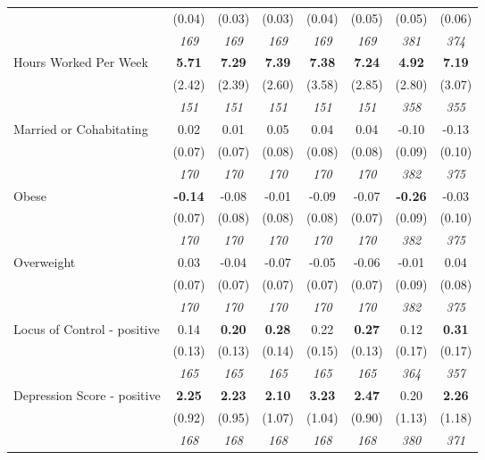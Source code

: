 \begin{tabular}{l c c c c c c c}
& (0.04) & (0.03) & (0.03) & (0.04) & (0.05) & (0.05) & (0.06) \\
& \textit{ 169 } & \textit{ 169 } & \textit{ 169 } & \textit{ 169 } & \textit{ 169 } & \textit{ 381 } & \textit{ 374 } \\
Hours Worked Per Week & \textbf{ 5.71 } & \textbf{ 7.29 } & \textbf{ 7.39 } & \textbf{7.38} & \textbf{7.24} & \textbf{ 4.92 } & \textbf{ 7.19 } \\
& (2.42) & (2.39) & (2.60) & (3.58) & (2.85) & (2.80) & (3.07) \\
& \textit{ 151 } & \textit{ 151 } & \textit{ 151 } & \textit{ 151 } & \textit{ 151 } & \textit{ 358 } & \textit{ 355 } \\
Married or Cohabitating & 0.02 & 0.01 & 0.05 & 0.04 & 0.04 & -0.10 & -0.13 \\
& (0.07) & (0.07) & (0.08) & (0.08) & (0.08) & (0.09) & (0.10) \\
& \textit{ 170 } & \textit{ 170 } & \textit{ 170 } & \textit{ 170 } & \textit{ 170 } & \textit{ 382 } & \textit{ 375 } \\
Obese & \textbf{ -0.14 } & -0.08 & -0.01 & -0.09 & -0.07 & \textbf{ -0.26 } & -0.03 \\
& (0.07) & (0.08) & (0.08) & (0.08) & (0.07) & (0.09) & (0.10) \\
& \textit{ 170 } & \textit{ 170 } & \textit{ 170 } & \textit{ 170 } & \textit{ 170 } & \textit{ 382 } & \textit{ 375 } \\
Overweight & 0.03 & -0.04 & -0.07 & -0.05 & -0.06 & -0.01 & 0.04 \\
& (0.07) & (0.07) & (0.07) & (0.07) & (0.07) & (0.09) & (0.08) \\
& \textit{ 170 } & \textit{ 170 } & \textit{ 170 } & \textit{ 170 } & \textit{ 170 } & \textit{ 382 } & \textit{ 375 } \\
Locus of Control - positive & 0.14 & \textbf{ 0.20 } & \textbf{ 0.28 } & 0.22 & \textbf{0.27} & 0.12 & \textbf{ 0.31 } \\
& (0.13) & (0.13) & (0.14) & (0.15) & (0.13) & (0.17) & (0.17) \\
& \textit{ 165 } & \textit{ 165 } & \textit{ 165 } & \textit{ 165 } & \textit{ 165 } & \textit{ 364 } & \textit{ 357 } \\
Depression Score - positive & \textbf{ 2.25 } & \textbf{ 2.23 } & \textbf{ 2.10 } & \textbf{3.23} & \textbf{2.47} & 0.20 & \textbf{ 2.26 } \\
& (0.92) & (0.95) & (1.07) & (1.04) & (0.90) & (1.13) & (1.18) \\
& \textit{ 168 } & \textit{ 168 } & \textit{ 168 } & \textit{ 168 } & \textit{ 168 } & \textit{ 380 } & \textit{ 371 } \\

\end{tabular}
